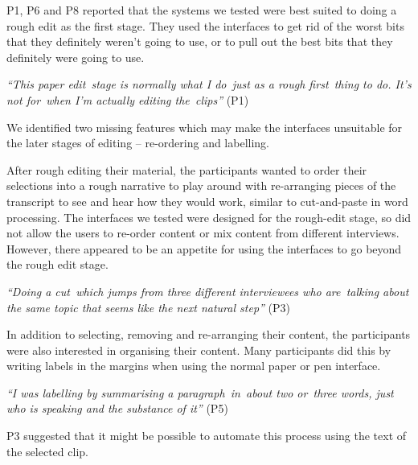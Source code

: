 P1, P6 and P8 reported that the systems we tested were best suited to doing a rough edit as the first stage.  They used
the interfaces to get rid of the worst bits that they definitely weren't going to use, or to pull out the best bits
that they definitely were going to use.

\textit{``This paper edit stage is normally what I do just as a rough first thing to do. It's not for when I'm actually
editing the clips''} (P1)

We identified two missing features which may make the interfaces unsuitable for the later stages of editing --
re-ordering and labelling.


After rough editing their material, the participants wanted to order their selections into a rough narrative to play
around with re-arranging pieces of the transcript to see and hear how they would work, similar to cut-and-paste in word
processing.  The interfaces we tested were designed for the rough-edit stage, so did not allow the users to re-order
content or mix content from different interviews. However, there appeared to be an appetite for using the interfaces to
go beyond the rough edit stage.

\textit{``Doing a cut which jumps from three different interviewees who are talking about the same topic that seems
like the next natural step''} (P3)


In addition to selecting, removing and re-arranging their content, the participants were also interested in organising
their content.
Many participants did this by writing labels in the margins when using the normal paper or pen interface.

\textit{``I was labelling by summarising a paragraph in about two or three words, just who is speaking and the
substance of it''} (P5)

P3 suggested that it might be possible to automate this process using the text of the selected clip.


